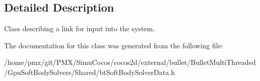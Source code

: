 \subsection{Detailed Description}
Class describing a link for input into the system. 

The documentation for this class was generated from the following file\+:\begin{DoxyCompactItemize}
\item 
/home/pmx/git/\+P\+M\+X/\+Simu\+Cocos/cocos2d/external/bullet/\+Bullet\+Multi\+Threaded/\+Gpu\+Soft\+Body\+Solvers/\+Shared/bt\+Soft\+Body\+Solver\+Data.\+h\end{DoxyCompactItemize}

